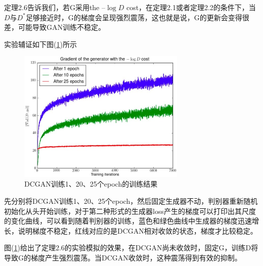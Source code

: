             \par
            定理2.6告诉我们，若G采用the –$\log D$ cost，在定理2.1或者定理2.2的条件下，当$D$与$D^*$足够接近时，G的梯度会呈现强烈震荡，这也就是说，G的更新会变得很差，可能导致GAN训练不稳定。
            \par
            实验辅证如下图(\ref{fig:WGAN前作Figure 3})所示
                \begin{figure}[H]
                \centering
                \includegraphics[width=8cm]{images/WGAN_make_Figure3.jpg}
                \caption{DCGAN训练1、20、25个epoch的训练结果}
                \label{fig:WGAN前作Figure 3}
                \end{figure}
            先分别将DCGAN训练1、20、25个epoch，然后固定生成器不动，判别器重新随机初始化从头开始训练，对于第二种形式的生成器loss产生的梯度可以打印出其尺度的变化曲线，可以看到随着判别器的训练，蓝色和绿色曲线中生成器的梯度迅速增长，说明梯度不稳定，红线对应的是DCGAN相对收敛的状态，梯度才比较稳定。
            \par
            图(\ref{fig:WGAN前作Figure 3})给出了定理2.6的实验模拟的效果，在DCGAN尚未收敛时，固定G，训练D将导致G的梯度产生强烈震荡。当DCGAN收敛时，这种震荡得到有效的抑制。
